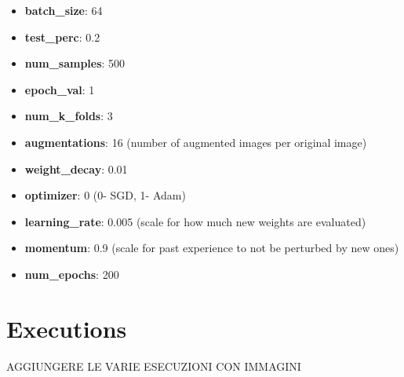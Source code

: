 \documentclass{report}
\begin{document}
\begin{itemize}
  \item \textbf{batch\_size}: 64
  \item \textbf{test\_perc}: 0.2
  \item \textbf{num\_samples}: 500
  \item \textbf{epoch\_val}: 1
  \item \textbf{num\_k\_folds}: 3
  \item \textbf{augmentations}: 16 (number of augmented images per original image)
  \item \textbf{weight\_decay}: 0.01
  \item \textbf{optimizer}: 0 (0- SGD, 1- Adam)
  \item \textbf{learning\_rate}: 0.005 (scale for how much new weights are evaluated)
  \item \textbf{momentum}: 0.9 (scale for past experience to not be perturbed by new ones)
  \item \textbf{num\_epochs}: 200
\end{itemize}
\pagebreak
\section{Executions}
AGGIUNGERE LE VARIE ESECUZIONI CON IMMAGINI\\
\end{document}
